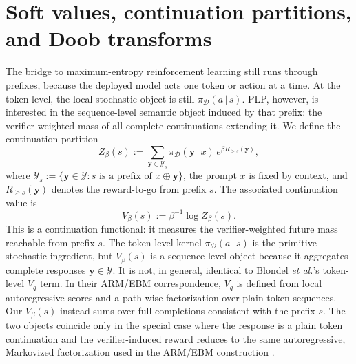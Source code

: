 \documentclass[aps,pre,reprint,superscriptaddress,nofootinbib]{revtex4-2}
\newcommand{\given}{\,|\,}
\newcommand{\cY}{\mathcal{Y}}
\newcommand{\y}{\mathbf{y}}
\begin{document}
\section{Soft values, continuation partitions, and Doob transforms}

The bridge to maximum-entropy reinforcement learning still runs through prefixes, because the deployed model acts one token or action at a time.
At the token level, the local stochastic object is still $\pi_{\mathcal D}(a\given s)$. PLP, however, is interested in the sequence-level semantic object induced by that prefix: the verifier-weighted mass of all complete continuations extending it.
We define the continuation partition
\begin{equation}
Z_\beta(s):=\sum_{\y\in\cY_s}\pi_{\mathcal D}(\y \given x)\,e^{\beta R_{\ge s}(\y)},
\label{eq:continuation-partition}
\end{equation}
where $\cY_s:=\{\y\in\cY : \text{$s$ is a prefix of } x\oplus\y\}$, the prompt $x$ is fixed by context, and $R_{\ge s}(\y)$ denotes the reward-to-go from prefix $s$.
The associated continuation value is
\begin{equation}
V_\beta(s):=\beta^{-1}\log Z_\beta(s).
\label{eq:continuation-value}
\end{equation}
This is a continuation functional: it measures the verifier-weighted future mass reachable from prefix $s$.
The token-level kernel $\pi_{\mathcal D}(a\given s)$ is the primitive stochastic ingredient, but $V_\beta(s)$ is a sequence-level object because it aggregates complete responses $\y\in\cY$.
It is not, in general, identical to Blondel \textit{et al.}'s token-level $V_q$ term.
In their ARM/EBM correspondence, $V_q$ is defined from local autoregressive scores and a path-wise factorization over plain token sequences.
Our $V_\beta(s)$ instead sums over full completions consistent with the prefix $s$.
The two objects coincide only in the special case where the response is a plain token continuation and the verifier-induced reward reduces to the same autoregressive, Markovized factorization used in the ARM/EBM construction \cite{blondel2025autoregressive}.
\end{document}
